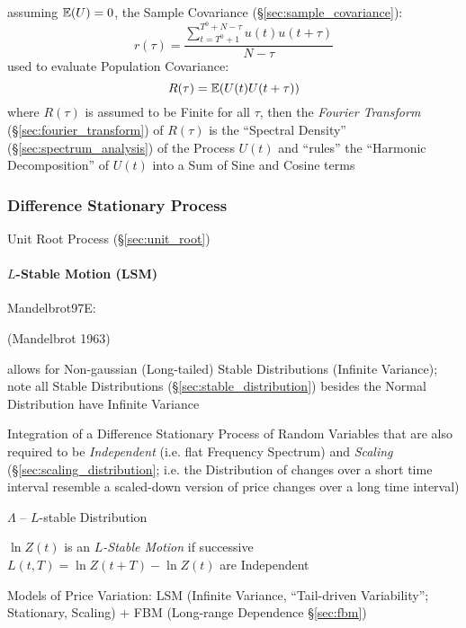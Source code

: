 assuming $\mathbb{E}(U) = 0$, the Sample Covariance
(\S\ref{sec:sample_covariance}):
\[
  r(\tau) = \frac{\sum_{t = T^0 + 1}^{T^0 + N - \tau} u(t) u(t + \tau)}
    {N - \tau}
\]
used to evaluate Population Covariance:
\[
  R(\tau) = \mathbb{E}(U(t) U(t + \tau))
\]
where $R(\tau)$ is assumed to be Finite for all $\tau$, then the \emph{Fourier
Transform} (\S\ref{sec:fourier_transform}) of $R(\tau)$ is the ``Spectral
Density'' (\S\ref{sec:spectrum_analysis}) of the Process $U(t)$ and ``rules''
the ``Harmonic Decomposition'' of $U(t)$ into a Sum of Sine and Cosine terms



\subsubsection{Difference Stationary Process}\label{sec:difference_stationary}

Unit Root Process (\S\ref{sec:unit_root})



\paragraph{$L$-Stable Motion (LSM)}\label{sec:lsm}\hfill


Mandelbrot97E:

(Mandelbrot 1963)

allows for Non-gaussian (Long-tailed) Stable Distributions (Infinite Variance);
note all Stable Distributions (\S\ref{sec:stable_distribution}) besides the
Normal Distribution have Infinite Variance


Integration of a Difference Stationary Process of Random Variables that are
also required to be \emph{Independent} (i.e. flat Frequency Spectrum) and
\emph{Scaling} (\S\ref{sec:scaling_distribution}; i.e. the Distribution of
changes over a short time interval resemble a scaled-down version of price
changes over a long time interval)

$\Lambda$ -- $L$-stable Distribution

$\ln Z(t)$ is an \emph{$L$-Stable Motion} if successive
$L(t, T) = \ln Z(t + T) - \ln Z(t)$ are Independent

Models of Price Variation: LSM (Infinite Variance, ``Tail-driven Variability'';
Stationary, Scaling) + FBM (Long-range Dependence \S\ref{sec:fbm})

